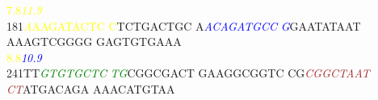 \documentclass[11pt,twoside,reqno,a4paper]{article}
\begin{document}
{\hspace*{4\charwidth}\hspace*{1\charwidth}\hspace*{10\charwidth}\textcolor{Yellow}{7.8}\hspace*{1\charwidth}\hspace*{1\charwidth}\hspace*{1\charwidth}\hspace*{28\charwidth}\textit{\textcolor{Yellow}{11.9}}\hspace*{1\charwidth}\hspace*{1\charwidth}\\
181\hspace*{1\charwidth}\textit{\textcolor{Yellow}{A}}\textcolor{Yellow}{A}\textcolor{Yellow}{A}\textcolor{Yellow}{G}\textcolor{Yellow}{A}\textcolor{Yellow}{T}\textcolor{Yellow}{A}\textcolor{Yellow}{C}\textcolor{Yellow}{T}\textcolor{Yellow}{C}	\textcolor{Yellow}{C}TCTGACTGC	A\textit{\textcolor{Blue}{A}}\textit{\textcolor{Blue}{C}}\textit{\textcolor{Blue}{A}}\textit{\textcolor{Blue}{G}}\textit{\textcolor{Blue}{A}}\textit{\textcolor{Blue}{T}}\textit{\textcolor{Blue}{G}}\textit{\textcolor{Blue}{C}}\textit{\textcolor{Blue}{C}}	\textit{\textcolor{Blue}{G}}GAATATAAT	AAAGTCGGGG	GAGTGTGAAA	\\
\hspace*{4\charwidth}\hspace*{1\charwidth}\textcolor{Yellow}{8.8}\hspace*{1\charwidth}\hspace*{1\charwidth}\hspace*{17\charwidth}\textit{\textcolor{Blue}{10.9}}\hspace*{1\charwidth}\hspace*{1\charwidth}\hspace*{1\charwidth}\hspace*{1\charwidth}\\
241\hspace*{1\charwidth}TT\textit{\textcolor{Green}{G}}\textit{\textcolor{Green}{T}}\textit{\textcolor{Green}{G}}\textit{\textcolor{Green}{T}}\textit{\textcolor{Green}{G}}\textit{\textcolor{Green}{C}}\textit{\textcolor{Green}{T}}\textit{\textcolor{Green}{C}}	\textit{\textcolor{Green}{T}}\textit{\textcolor{Green}{G}}CGGCGACT	GAAGGCGGTC	CG\textit{\textcolor{Brown}{C}}\textit{\textcolor{Brown}{G}}\textit{\textcolor{Brown}{G}}\textit{\textcolor{Brown}{C}}\textit{\textcolor{Brown}{T}}\textit{\textcolor{Brown}{A}}\textit{\textcolor{Brown}{A}}\textit{\textcolor{Brown}{T}}	\textit{\textcolor{Brown}{C}}\textit{\textcolor{Brown}{T}}ATGACAGA	AAACATGTAA	\\
}
\end{document}
